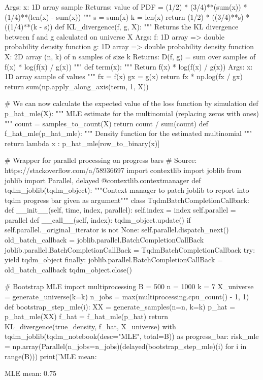 \begin{python}
    Args:
       x:  1D array  sample
    Returns:
       value of PDF = (1/2) * (3/4)**(sum(x)) * (1/4)**(len(x) - sum(x))
    """
    s = sum(x)
    k = len(x)
    return (1/2) * ((3/4)**s) * ((1/4)**(k - s))
def KL_divergence(f, g, X):
    """
    Returns the KL divergence between f and g calculated on universe X
    Args:
       f:  1D array => double  probability density function
       g:  1D array => double  probability density function
       X:  2D array (n, k) of n samples of size k
    Returns:  D(f, g) = sum over samples of f(x) * log(f(x) / g(x))
    """
    def term(x):
        """ 
        Return f(x) * log(f(x) / g(x)) 
        Args:
           x:  1D array sample of values
        """
        fx = f(x)
        gx = g(x)
        return fx * np.log(fx / gx)
    return sum(np.apply_along_axis(term, 1, X))
\end{python}

\begin{python}
# We can now calculate the expected value of the loss function by simulation
def p_hat_mle(X):
    """ MLE estimate for the multinomial (replacing zeros with ones) """
    count = samples_to_count(X)
    return count / sum(count)
def f_hat_mle(p_hat_mle):
    """ Density function for the estimated multinomial """
    return lambda x : p_hat_mle[row_to_binary(x)]
\end{python}

\begin{python}
# Wrapper for parallel processing on progress bars
# Source: https://stackoverflow.com/a/58936697
import contextlib
import joblib
from joblib import Parallel, delayed
@contextlib.contextmanager
def tqdm_joblib(tqdm_object):
    """Context manager to patch joblib to report into tqdm progress bar given as argument"""
    class TqdmBatchCompletionCallback:
        def __init__(self, time, index, parallel):
            self.index = index
            self.parallel = parallel
        def __call__(self, index):
            tqdm_object.update()
            if self.parallel._original_iterator is not None:
                self.parallel.dispatch_next()
    old_batch_callback = joblib.parallel.BatchCompletionCallBack
    joblib.parallel.BatchCompletionCallBack = TqdmBatchCompletionCallback
    try:
        yield tqdm_object
    finally:
        joblib.parallel.BatchCompletionCallBack = old_batch_callback
        tqdm_object.close()  
\end{python}

\begin{python}
# Bootstrap MLE
import multiprocessing
B = 500
n = 1000
k = 7
X_universe = generate_universe(k=k)
n_jobs = max(multiprocessing.cpu_count() - 1, 1)
def bootstrap_step_mle(i):
    XX = generate_samples(n=n, k=k)
    p_hat = p_hat_mle(XX)
    f_hat = f_hat_mle(p_hat)
    return KL_divergence(true_density, f_hat, X_universe)
with tqdm_joblib(tqdm_notebook(desc="MLE", total=B)) as progress_bar:
    risk_mle = np.array(Parallel(n_jobs=n_jobs)(delayed(bootstrap_step_mle)(i)
                                 for i in range(B)))
print('MLE mean: %
\end{python}
\begin{console}
MLE mean: 0.75
\end{console}

